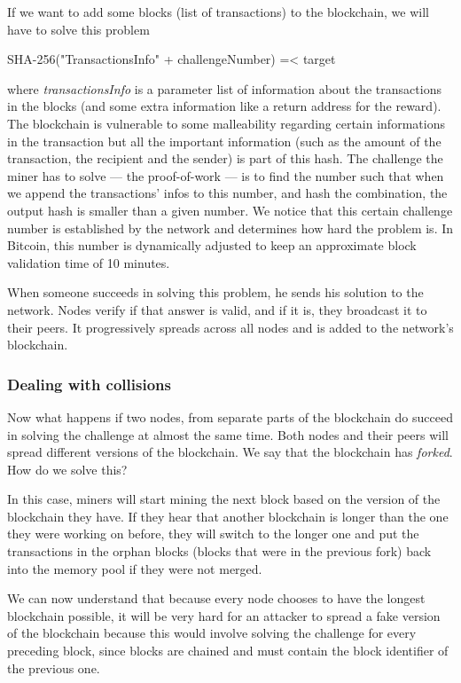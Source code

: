 \documentclass{vldb}
\begin{document}
If we want to add some blocks (list of transactions) to the blockchain, we will have to solve this problem
\begin{center}
SHA-256("TransactionsInfo" + challengeNumber) =< target
\end{center}
where \emph{transactionsInfo} is a parameter list of information about the transactions in the blocks (and some extra information like a return address for the reward). The blockchain is vulnerable to some malleability regarding certain informations in the transaction but all the important information (such as the amount of the transaction, the recipient and the sender) is part of this hash.
The challenge the miner has to solve --- the proof-of-work --- is to find the number such that when we append the transactions' infos to this number, and hash the combination, the output hash is smaller than a given number.
We notice that this certain challenge number is established by the network and determines how hard the problem is. In Bitcoin, this number is dynamically adjusted to keep an approximate block validation time of 10 minutes.\cite{hashCash}

When someone succeeds in solving this problem, he sends his solution to the network. Nodes verify if that answer is valid, and if it is, they broadcast it to their peers. It progressively spreads across all nodes and is added to the network's blockchain. 

\subsubsection{Dealing with collisions}

Now what happens if two nodes, from separate parts of the blockchain do succeed in solving the challenge at almost the same time. Both nodes and their peers will spread different versions of the blockchain. We say that the blockchain has \emph{forked}. How do we solve this?

In this case, miners will start mining the next block based on the version of the blockchain they have. If they hear that another blockchain is longer than the one they were working on before, they will switch to the longer one and put the transactions in the orphan blocks (blocks that were in the previous fork) back into the memory pool if they were not merged. 

We can now understand that because every node chooses to have the longest blockchain possible, it will be very hard for an attacker to spread a fake version of the blockchain because this would involve solving the challenge for every preceding block, since blocks are chained and must contain the block identifier of the previous one. 
\end{document}
